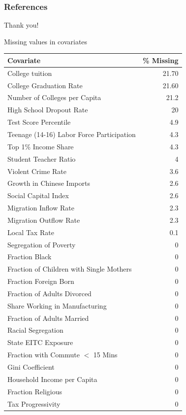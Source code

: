 \documentclass{beamer}
\begin{document}
\begin{frame}[allowframebreaks]
\frametitle<presentation>{References}
\tiny{}
\end{frame}

\begin{frame}
\begin{center}
\huge{Thank you!}
\end{center}
\end{frame}

\begin{frame}{Missing values in covariates}
\begin{table}[ht]
	\centering
	\tiny
	\begin{tabular}{lr}
		\hline
		Covariate & \% Missing \\ 
		\hline
		College tuition & 21.70 \\ 
		College Graduation Rate & 21.60 \\ 
		Number of Colleges per Capita & 21.2 \\ 
		High School Dropout Rate & 20 \\  
		Test Score Percentile & 4.9 \\ 
		Teenage (14-16) Labor Force Participation & 4.3 \\ 
		Top 1\% Income Share & 4.3 \\ 
		Student Teacher Ratio & 4 \\ 
		Violent Crime Rate & 3.6 \\ 
		Growth in Chinese Imports & 2.6 \\ 
		Social Capital Index & 2.6 \\ 
		Migration Inflow Rate & 2.3 \\ 
		Migration Outflow Rate & 2.3 \\ 
		Local Tax Rate & 0.1 \\ 
		Segregation of Poverty & 0 \\ 
		Fraction Black & 0 \\ 
		Fraction of Children with Single Mothers& 0 \\ 
		Fraction Foreign Born & 0\\ 
		Fraction of Adults Divorced& 0 \\ 
		Share Working in Manufacturing & 0 \\ 
		Fraction of Adults Married & 0\\ 
		Racial Segregation & 0 \\ 
		State EITC Exposure &0 \\ 
		Fraction with Commute $<$ 15 Mins & 0 \\ 
		Gini Coefficient& 0 \\ 
		Household Income per Capita & 0 \\ 
		Fraction Religious & 0 \\ 
		Tax Progressivity& 0 \\ 
		\hline
	\end{tabular}
\end{table}
\end{frame}
\end{document}
